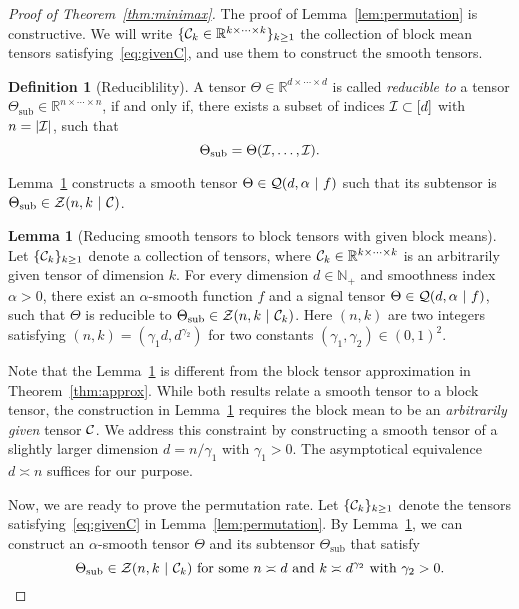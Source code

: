 \documentclass[11pt]{article}
\theoremstyle{definition}
\newtheorem{lem}[thm]{Lemma}
\newtheorem{defn}{Definition}
\begin{document}
\begin{proof}[Proof of Theorem~\ref{thm:minimax}]
The proof of Lemma~\ref{lem:permutation} is constructive. We will write $\{\mathcal{C}_k\in\mathbb{R}^{k\times \cdots \times k}\}_{k\geq 1}$ the collection of block mean tensors satisfying~\eqref{eq:givenC}, and use them to construct the smooth tensors. 

 \begin{defn}[Reduciblility] A tensor $\Theta\in\mathbb{R}^{d\times \cdots \times d}$ is called \emph{reducible to} a tensor $\Theta_{\text{sub}}\in\mathbb{R}^{n\times \cdots \times n}$, if and only if, there exists a subset of indices $\mathcal{I}\subset [d]$ with $n=|\mathcal{I}|$, such that
\[
\Theta_{\text{sub}} = \Theta(\mathcal{I},\ldots,\mathcal{I}).
\]
\end{defn}

Lemma~\ref{lem:expand} constructs a smooth tensor $\Theta\in \tQ(d, \alpha \ |\ f)$ such that its subtensor is $\Theta_{\text{sub}}\in \mathcal{Z}(n,k\ |\ \mathcal{C})$. 
\begin{lem}[Reducing smooth tensors to block tensors with given block means]\label{lem:expand} Let $\{\mathcal{C}_k\}_{k\geq 1}$ denote a collection of tensors, where $\mathcal{C}_k\in\mathbb{R}^{k\times \cdots \times k}$ is an arbitrarily given tensor of dimension $k$. 
For every dimension $d\in\mathbb{N}_{+}$ and smoothness index $\alpha>0$, there exist an $\alpha$-smooth function $f$ and a signal tensor $\Theta\in \tQ(d,\alpha\ |\ f)$, such that $\Theta$ is reducible to $\Theta_{\text{sub}}\in \mathcal{Z}(n,k\ | \ \mathcal{C}_k)$. Here $(n,k)$ are two integers satisfying
 $(n,k)=(\gamma_1 d, d^{\gamma_2})$ for two constants $(\gamma_1,\gamma_2)\in(0,1)^2$. 
 \end{lem}


Note that the Lemma~\ref{lem:expand} is different from the block tensor approximation in Theorem~\ref{thm:approx}. While both results relate a smooth tensor to a block tensor, the construction in Lemma~\ref{lem:expand} requires the block mean to be an \emph{arbitrarily given} tensor $\mathcal{C}$. We address this constraint by constructing a smooth tensor of a slightly larger dimension $d=n/\gamma_1$ with $\gamma_1>0$. The asymptotical equivalence $d\asymp n$ suffices for our purpose. 




Now, we are ready to prove the permutation rate. Let $\{\mathcal{C}_k\}_{k\geq 1}$ denote the tensors satisfying~\eqref{eq:givenC} in Lemma~\ref{lem:permutation}. By Lemma~\ref{lem:expand}, we can construct an $\alpha$-smooth tensor $\Theta$ and its subtensor $\Theta_{\text{sub}}$ that satisfy
\[
\Theta_{\text{sub}}\in \mathcal{Z}(n,k\ | \ \mathcal{C}_k) \text{ for some $n\asymp d$ and $k\asymp d^{\gamma_2}$ with $\gamma_2>0$}. 
\]



\end{proof}
\end{document}
